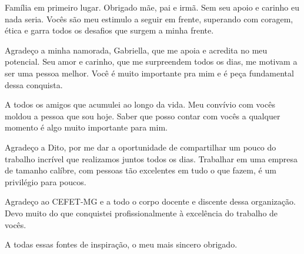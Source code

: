 
\begin{agradecimentos}

Família em primeiro lugar. Obrigado mãe, pai e irmã. Sem seu apoio e carinho eu nada seria. Vocês são meu estimulo a seguir em frente, superando com coragem, ética e garra todos os desafios que surgem a minha frente.

Agradeço a minha namorada, Gabriella, que me apoia e acredita no meu potencial. Seu amor e carinho, que me surpreendem todos os dias, me motivam a ser uma pessoa melhor. Você é muito importante pra mim e é peça fundamental dessa conquista.

A todos os amigos que acumulei ao longo da vida. Meu convívio com vocês moldou a pessoa que sou hoje. Saber que posso contar com vocês a qualquer momento é algo muito importante para mim.

Agradeço a Dito, por me dar a oportunidade de compartilhar um pouco do trabalho incrível que realizamos juntos todos os dias. Trabalhar em uma empresa de tamanho calíbre, com pessoas tão excelentes em tudo o que fazem, é um privilégio para poucos.

Agradeço ao CEFET-MG e a todo o corpo docente e discente dessa organização. Devo muito do que conquistei profissionalmente à excelência do trabalho de vocês.

A todas essas fontes de inspiração, o meu mais sincero obrigado.

\end{agradecimentos}
